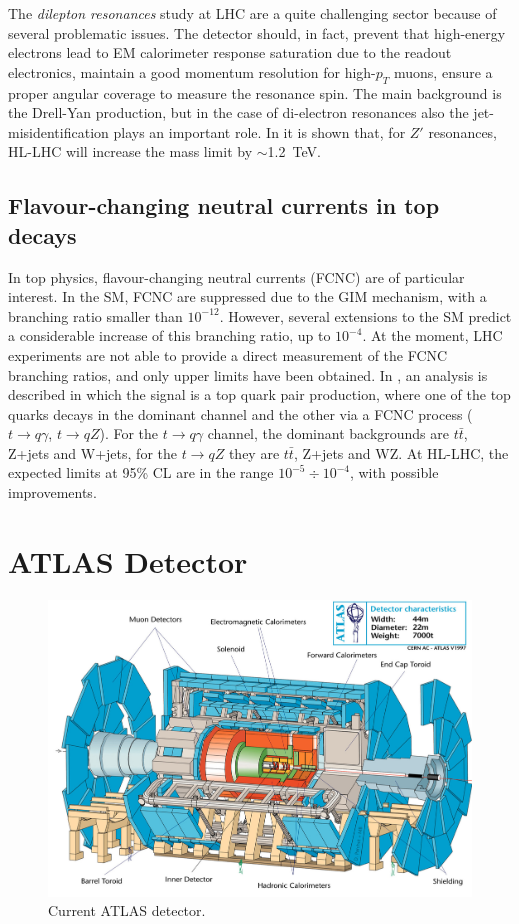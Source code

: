 \documentclass[a4paper,twoside,12pt]{book}
\begin{document}
The \textit{dilepton resonances} study at LHC are a quite challenging sector because of
several problematic issues. The detector should, in fact, prevent that high-energy electrons lead to EM calorimeter
response saturation due to the readout electronics, maintain a good momentum resolution for high-$p_T$ muons, ensure a proper angular coverage to measure the resonance spin. The main background is the Drell-Yan production, but in the 
case of di-electron resonances also the jet-misidentification plays an important role. In \cite{loi}
it is shown that, for $Z'$ resonances, HL-LHC will increase the mass limit by \mbox{$\sim$1.2 TeV}.

\section{Flavour-changing neutral currents in top decays}
In top physics, flavour-changing neutral currents (FCNC) are of particular interest.
In the SM, FCNC are suppressed due to the GIM mechanism, with a branching ratio smaller
than $10^{-12}$. However, several extensions to the SM predict a considerable increase of this branching ratio, up to $10^{-4}$. At the moment, LHC experiments are not able to provide a direct measurement of the FCNC branching ratios, and only upper limits have been obtained. 
In \cite{loi}, an analysis is described in which the signal is a top quark pair production, where
one of the top quarks decays in the dominant channel and the other via a FCNC process 
($t \rightarrow q\gamma$, $t \rightarrow qZ$). For the $t \rightarrow q\gamma$ channel, 
the dominant backgrounds are $t\bar{t}$, Z+jets and W+jets, for the $t \rightarrow qZ$ they are $t\bar{t}$, Z+jets and WZ. At HL-LHC, the expected limits at 95\% CL are in the range
$10^{-5} \div 10^{-4}$, with possible improvements. 

\clearpage

\chapter{ATLAS Detector} \label{sec:detector}

\begin{figure} [h]
	\includegraphics[width=\textwidth]{atlasdet}
	\caption{Current ATLAS detector.}
	\label{fig:current_atlasdet}
\end{figure}
\end{document}
